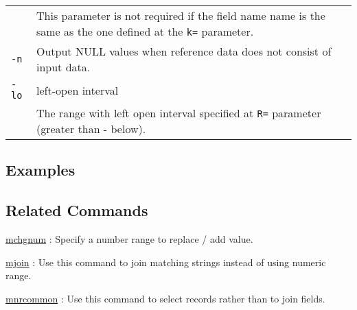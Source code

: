\begin{table}[htbp]
{\begin{tabular}{ll}
   & This parameter is not required if the field name name is the same as the one defined at the \verb|k=| parameter. \\
\verb|-n|    & Output NULL values when reference data does not consist of input data.\\
\verb|-lo|   & left-open interval\\
             & The range with left open interval specified at \verb|R=| parameter (greater than - below).\\
\end{tabular} 
}
\end{table} 



\subsection*{Examples}

\subsection*{Related Commands}
\hyperref[sect:mchgnum]{mchgnum} : Specify a number range to replace / add value.

\hyperref[sect:mjoin]{mjoin} : Use this command to join matching strings instead of using numeric range. 

\hyperref[sect:mnrcommon]{mnrcommon} : Use this command to select records rather than to join fields. 
%
